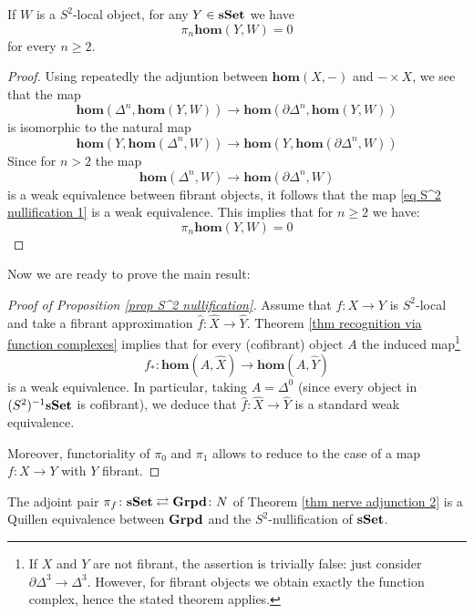 \begin{refsection}
\begin{cor} \label{cor S^2 nullification}
If $W$ is a $S^2$-local object, for any $Y \in \mathbf{sSet}$ we have
\[
\pi_n \mathbf{hom}(Y,W) = 0
\]
for every $n \ge 2$.
\end{cor}

\begin{proof}
Using repeatedly the adjuntion between $\mathbf{hom}(X,-)$ and $- \times X$, we see that the map
\begin{equation} \label{eq S^2 nullification 1}
\mathbf{hom}(\Delta^n, \mathbf{hom}(Y,W)) \to \mathbf{hom}(\partial \Delta^n, \mathbf{hom}(Y,W))
\end{equation}
is isomorphic to the natural map
\[
\mathbf{hom}(Y, \mathbf{hom}(\Delta^n,W)) \to \mathbf{hom}(Y, \mathbf{hom}(\partial \Delta^n,W))
\]
Since for $n > 2$ the map
\[
\mathbf{hom}(\Delta^n,W) \to \mathbf{hom}(\partial \Delta^n,W)
\]
is a weak equivalence between fibrant objects, it follows that the map \eqref{eq S^2 nullification 1} is a weak equivalence. This implies that for $n \ge 2$ we have:
\[
\pi_n \mathbf{hom}(Y,W) = 0
\]
\end{proof}

Now we are ready to prove the main result:

\begin{proof}[Proof of Proposition \ref{prop S^2 nullification}]
Assume that $f \colon X \to Y$ is $S^2$-local and take a fibrant approximation $\widehat{f} \colon \widehat{X} \to \widehat{Y}$. Theorem \ref{thm recognition via function complexes} implies that for every (cofibrant) object $A$ the induced map\footnote{If $X$ and $Y$ are not fibrant, the assertion is trivially false: just consider $\partial \Delta^3 \to \Delta^3$. However, for fibrant objects we obtain exactly the function complex, hence the stated theorem applies.}
\[
f_* \colon \mathbf{hom}(A,\widehat{X}) \to \mathbf{hom}(A,\widehat{Y})
\]
is a weak equivalence. In particular, taking $A = \Delta^0$ (since every object in $(S^2)^{-1} \mathbf{sSet}$ is cofibrant), we deduce that $\widehat{f} \colon \widehat{X} \to \widehat{Y}$ is a standard weak equivalence.

Moreover, functoriality of $\pi_0$ and $\pi_1$ allows to reduce to the case of a map $f \colon X \to Y$ with $Y$ fibrant.
\end{proof}

\begin{thm} \label{thm groupoids nullification}
The adjoint pair $\pi_f \colon \mathbf{sSet} \rightleftarrows \mathbf{Grpd} \colon N$ of Theorem \ref{thm nerve adjunction 2} is a Quillen equivalence between $\mathbf{Grpd}$ and the $S^2$-nullification of $\mathbf{sSet}$.
\end{thm}


\end{refsection}
